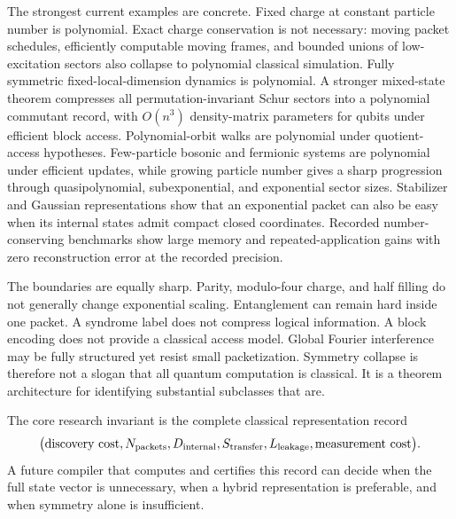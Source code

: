 The strongest current examples are concrete. Fixed charge at constant particle number is polynomial. Exact charge conservation is not necessary: moving packet schedules, efficiently computable moving frames, and bounded unions of low-excitation sectors also collapse to polynomial classical simulation. Fully symmetric fixed-local-dimension dynamics is polynomial. A stronger mixed-state theorem compresses all permutation-invariant Schur sectors into a polynomial commutant record, with $O(n^3)$ density-matrix parameters for qubits under efficient block access. Polynomial-orbit walks are polynomial under quotient-access hypotheses. Few-particle bosonic and fermionic systems are polynomial under efficient updates, while growing particle number gives a sharp progression through quasipolynomial, subexponential, and exponential sector sizes. Stabilizer and Gaussian representations show that an exponential packet can also be easy when its internal states admit compact closed coordinates. Recorded number-conserving benchmarks show large memory and repeated-application gains with zero reconstruction error at the recorded precision.

The boundaries are equally sharp. Parity, modulo-four charge, and half filling do not generally change exponential scaling. Entanglement can remain hard inside one packet. A syndrome label does not compress logical information. A block encoding does not provide a classical access model. Global Fourier interference may be fully structured yet resist small packetization. Symmetry collapse is therefore not a slogan that all quantum computation is classical. It is a theorem architecture for identifying substantial subclasses that are.

The core research invariant is the complete classical representation record
\[
\bigl(
\text{discovery cost},
N_{\rm packets},
D_{\rm internal},
S_{\rm transfer},
L_{\rm leakage},
\text{measurement cost}
\bigr).
\]
A future compiler that computes and certifies this record can decide when the full state vector is unnecessary, when a hybrid representation is preferable, and when symmetry alone is insufficient.

